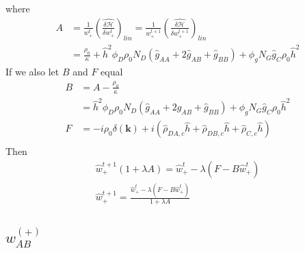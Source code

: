 \documentclass{article}
\begin{document}
  where
  \begin{align*}
    A &=
    \frac{1}{w_+^t}
    \left( \hat{\frac{\delta \mathcal{H}}{\delta w_+^t}} \right) _{lin}
    =
    \frac{1}{w_+^{t+1}}
    \left( \hat{\frac{\delta \mathcal{H}}{\delta w_+^{t+1}}} \right) _{lin} \\
    &=
    \frac{\rho_0}{\kappa}
        + \hat{h}^2 \phi_D \rho_0 N_D
          (\hat{g}_{AA} + 2 \hat{g}_{AB} + \hat{g}_{BB})
       + \phi_g N_G \hat{g}_{C} \rho_0 \hat{h}^2
  \end{align*}
  If we also let $B$ and $F$ equal
  \begin{align*}
    B &= A - \frac{\rho_0}{\kappa} \\
      &= \hat{h}^2 \phi_D \rho_0 N_D
          (\hat{g}_{AA} + 2 \hat{g}_{AB} + \hat{g}_{BB})
       + \phi_g N_G \hat{g}_{C} \rho_0 \hat{h}^2 \\ 
    F &= - i \rho_0 \delta (\mathbf{k})
         + i ( \hat{\rho}_{DA,c} \hat{h}
              + \hat{\rho}_{DB,c} \hat{h}
              + \hat{\rho}_{C,c}  \hat{h} ) \\
  \end{align*}
  Then
  \begin{align*}
    \hat{w}_+^{t+1} ( 1 + \lambda A ) =
    \hat{w}_+^t - \lambda \left( F - B \hat{w}_+^t \right) \\
    \hat{w}_+^{t+1} =
    \frac{\hat{w}_+^t - \lambda \left( F - B \hat{w}_+^t \right)}
         {1 + \lambda A}
  \end{align*}
  
  \subsection{$w_{AB}^{(+)}$}
\end{document}
